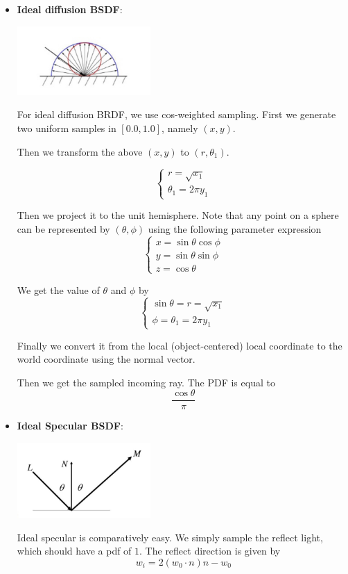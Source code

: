 \documentclass[acmtog]{acmart}
\begin{document}
\begin{itemize}
	\item \textbf{Ideal diffusion BSDF}:
	
	\begin{center}
		\includegraphics[width=0.4\textwidth]{pictures/ideal-diffuse.jpg}
	\end{center}

	For ideal diffusion BRDF, we use cos-weighted sampling. First we generate two uniform samples in $[0.0, 1.0]$, namely $(x, y)$.

	Then we transform the above $(x,y)$ to $(r, \theta_1)$.

	\[\begin{cases}
		r = \sqrt{x_1}\\
		\theta_1 = 2\pi y_1
	\end{cases}\]

	Then we project it to the unit hemisphere. Note that any point on a sphere can be represented by $(\theta, \phi)$ using the following parameter expression 
	\[\begin{cases}
		x = \sin \theta \cos \phi\\
		y = \sin \theta \sin \phi\\
		z = \cos \theta
	\end{cases}\]

	We get the value of $\theta$ and $\phi$ by \[\begin{cases}
		\sin \theta = r = \sqrt{x_1}\\
		\phi = \theta_1 = 2\pi y_1
	\end{cases}\]

	Finally we convert it from the local (object-centered) local coordinate to the world coordinate using the normal vector.

	Then we get the sampled incoming ray. The PDF is equal to \[
		\frac{\cos \theta}{\pi}
	\]

	\item \textbf{Ideal Specular BSDF}:
	
	\begin{center}
		\includegraphics[width=0.4\textwidth]{pictures/ideal-specular.jpg}
	\end{center}
	
	Ideal specular is comparatively easy. We simply sample the reflect light, which should have a pdf of $1$. The reflect direction is given by \[
		w_i = 2(w_0 \cdot n) n - w_0
	\]


\end{itemize}
\end{document}
